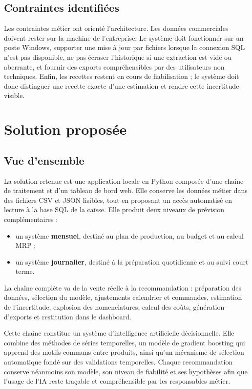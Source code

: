 \subsection{Contraintes identifiées}

Les contraintes métier ont orienté l'architecture. Les données commerciales
doivent rester sur la machine de l'entreprise. Le système doit fonctionner sur un
poste Windows, supporter une mise à jour par fichiers lorsque la connexion SQL
n'est pas disponible, ne pas écraser l'historique si une extraction est vide ou
aberrante, et fournir des exports compréhensibles par des utilisateurs non
techniques. Enfin, les recettes restent en cours de fiabilisation ; le système doit
donc distinguer une recette exacte d'une estimation et rendre cette incertitude
visible.

\section{Solution proposée}

\subsection{Vue d'ensemble}

La solution retenue est une application locale en Python composée d'une chaîne de
traitement et d'un tableau de bord web. Elle conserve les données métier dans des
fichiers CSV et JSON lisibles, tout en proposant un accès automatisé en lecture à
la base SQL de la caisse. Elle produit deux niveaux de prévision complémentaires :

\begin{itemize}
  \item un système \textbf{mensuel}, destiné au plan de production, au budget et
  au calcul MRP ;
  \item un système \textbf{journalier}, destiné à la préparation quotidienne et
  au suivi court terme.
\end{itemize}

La chaîne complète va de la vente réelle à la recommandation : préparation des
données, sélection du modèle, ajustements calendrier et commandes, estimation de
l'incertitude, explosion des nomenclatures, calcul des coûts, génération d'exports
et restitution dans le dashboard.

Cette chaîne constitue un système d'intelligence artificielle décisionnelle. Elle
combine des méthodes de séries temporelles, un modèle de gradient boosting qui
apprend des motifs communs entre produits, ainsi qu'un mécanisme de sélection
automatique fondé sur des validations temporelles. Chaque recommandation conserve
néanmoins son modèle, son niveau de fiabilité et ses hypothèses afin que l'usage de
l'IA reste traçable et compréhensible par les responsables métier.

